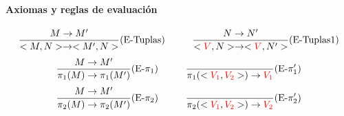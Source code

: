\paragraph{Axiomas y reglas de evaluación}
\begin{equation*}
\frac{M\to M'}{<M,N>\to<M',N>}(\text{E-Tuplas})\hspace*{1cm}\frac{N\to N'}{<\color{red}V\color{black},N>\to<\color{red}V\color{black},N'>}(\text{E-Tuplas1})
\end{equation*}
\vspace*{5mm}
\begin{equation*}
\frac{M\to M'}{\pi_1(M)\to\pi_1(M')}(\text{E-}\pi_1)\hspace*{1cm}\frac{}{\pi_1(<\color{red}V_1\color{black}, \color{red}V_2\color{black}>)\to\color{red}V_1\color{black}}(\text{E-}\pi'_1)
\end{equation*}
\vspace*{5mm}
\begin{equation*}
\frac{M\to M'}{\pi_2(M)\to\pi_2(M')}(\text{E-}\pi_2)\hspace*{1cm}\frac{}{\pi_2(<\color{red}V_1\color{black}, \color{red}V_2\color{black}>)\to\color{red}V_2\color{black}}(\text{E-}\pi'_2)
\end{equation*}
